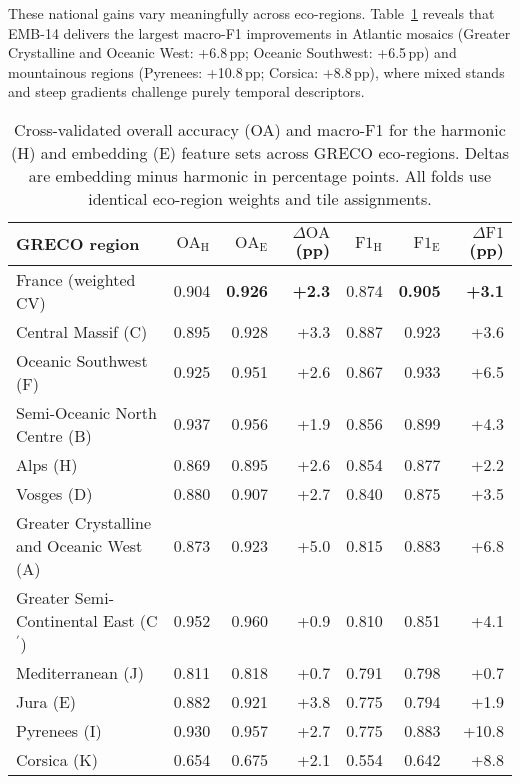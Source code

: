 \documentclass[utf8]{FrontiersinHarvard}
\begin{document}
These national gains vary meaningfully across eco-regions. Table~\ref{tab:regional_performance} reveals that EMB-14 delivers the largest macro-F1 improvements in Atlantic mosaics (Greater Crystalline and Oceanic West: +6.8\,pp; Oceanic Southwest: +6.5\,pp) and mountainous regions (Pyrenees: +10.8\,pp; Corsica: +8.8\,pp), where mixed stands and steep gradients challenge purely temporal descriptors.
\begin{table}[H]
    \centering
    \small
    \begin{tabular}{lrrrrrr}
        \toprule
        \textbf{GRECO region} & $\mathrm{OA}_{\mathrm{H}}$ & $\mathrm{OA}_{\mathrm{E}}$ & $\Delta\mathrm{OA}$ (pp) & $\mathrm{F1}_{\mathrm{H}}$ & $\mathrm{F1}_{\mathrm{E}}$ & $\Delta\mathrm{F1}$ (pp) \\
        \midrule
        France (weighted CV) & 0.904 & \textbf{0.926} & \textbf{+2.3} & 0.874 & \textbf{0.905} & \textbf{+3.1} \\
        Central Massif (C) & 0.895 & 0.928 & +3.3 & 0.887 & 0.923 & +3.6 \\
        Oceanic Southwest (F) & 0.925 & 0.951 & +2.6 & 0.867 & 0.933 & +6.5 \\
        Semi-Oceanic North Centre (B) & 0.937 & 0.956 & +1.9 & 0.856 & 0.899 & +4.3 \\
        Alps (H) & 0.869 & 0.895 & +2.6 & 0.854 & 0.877 & +2.2 \\
        Vosges (D) & 0.880 & 0.907 & +2.7 & 0.840 & 0.875 & +3.5 \\
        Greater Crystalline and Oceanic West (A) & 0.873 & 0.923 & +5.0 & 0.815 & 0.883 & +6.8 \\
        Greater Semi-Continental East (C$^\prime$) & 0.952 & 0.960 & +0.9 & 0.810 & 0.851 & +4.1 \\
        Mediterranean (J) & 0.811 & 0.818 & +0.7 & 0.791 & 0.798 & +0.7 \\
        Jura (E) & 0.882 & 0.921 & +3.8 & 0.775 & 0.794 & +1.9 \\
        Pyrenees (I) & 0.930 & 0.957 & +2.7 & 0.775 & 0.883 & +10.8 \\
        Corsica (K) & 0.654 & 0.675 & +2.1 & 0.554 & 0.642 & +8.8 \\
        \bottomrule
    \end{tabular}
    \caption{Cross-validated overall accuracy (OA) and macro-F1 for the harmonic (H) and embedding (E) feature sets across GRECO eco-regions. Deltas are embedding minus harmonic in percentage points. All folds use identical eco-region weights and tile assignments.}
    \label{tab:regional_performance}
\end{table}
\end{document}
